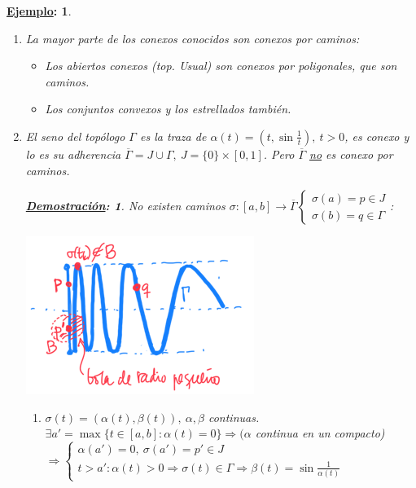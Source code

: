 \documentclass[10pt,a4paper,openright]{book}
\theoremstyle{break}
\newtheorem*{demo}{\underline{Demostración}:}
\newtheorem*{ej}{\underline{Ejemplo}:}
\begin{document}
\begin{ej}
\begin{enumerate}
    \item La mayor parte de los conexos conocidos son conexos por caminos:
    \begin{itemize}
        \item Los abiertos conexos (top. Usual) son conexos por poligonales, que son caminos.
        \item Los conjuntos convexos y los estrellados también.
    \end{itemize}
    \item El seno del topólogo $\Gamma$ es la traza de $\alpha\left( t \right) = \left( t, \sin\frac{1}{t} \right),\ t > 0$, es conexo y lo es su adherencia $\overline{\Gamma} = J \cup \Gamma,\ J = \{0\} \times \left[ 0, 1 \right]$. Pero $\overline{\Gamma}$ \underline{no} es conexo por caminos.
    \begin{demo}
        No existen caminos $\sigma: \left[ a, b \right] \rightarrow \overline{\Gamma} \begin{cases}
            \sigma\left( a \right) = p \in J\\
            \sigma\left( b \right) = q \in \Gamma
        \end{cases}$:
        \begin{center}
            \includegraphics[scale=0.3]{images/dem_sin_top_no_conx_caminos} 
        \end{center}
        \begin{enumerate}
            \item $\sigma\left( t \right) = \left( \alpha\left( t \right), \beta\left( t \right) \right),\ \alpha, \beta$ continuas. $\exists a' = \max \{t \in \left[ a, b \right] : \alpha\left( t \right) = 0\} \Rightarrow (\alpha$ continua en un compacto) %
            $\Rightarrow \begin{cases}
                \alpha\left( a' \right) = 0,\ \sigma\left( a' \right) = p' \in J\\
                t > a': \alpha\left( t \right) > 0 \Rightarrow \sigma\left( t \right) \in \Gamma \Rightarrow \beta\left( t \right) = \sin \frac{1}{\alpha\left( t \right)} 
            \end{cases} $


\end{enumerate}
\end{demo}
\end{enumerate}
\end{ej}
\end{document}

